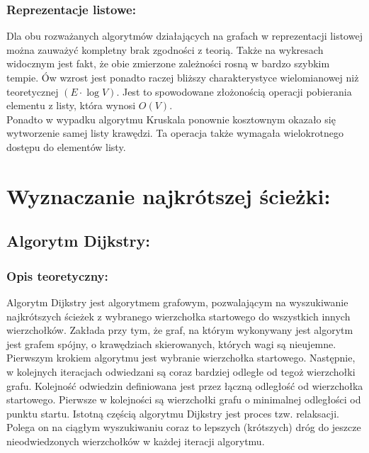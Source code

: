 \documentclass[a4paper,12pt]{article}
\begin{document}
\subsubsection{Reprezentacje listowe:}
Dla obu rozważanych algorytmów działających na grafach w reprezentacji listowej można zauważyć kompletny brak zgodności z teorią. Także na wykresach widocznym jest fakt, że obie zmierzone zależności rosną w bardzo szybkim tempie. Ów wzrost jest ponadto raczej bliższy charakterystyce wielomianowej niż teoretycznej $(E \cdot \log V)$. Jest to spowodowane złożonością operacji pobierania elementu z listy, która wynosi $O(V)$.\\

\noindent
Ponadto w wypadku algorytmu Kruskala ponownie kosztownym okazało się wytworzenie samej listy krawędzi. Ta operacja także wymagała wielokrotnego dostępu do elementów listy.

\section{Wyznaczanie najkrótszej ścieżki:}

\subsection{Algorytm Dijkstry:}

\subsubsection{Opis teoretyczny:}
Algorytm Dijkstry jest algorytmem grafowym, pozwalającym na wyszukiwanie najkrótszych ścieżek z wybranego wierzchołka startowego do wszystkich innych wierzchołków. Zakłada przy tym, że graf, na którym wykonywany jest algorytm jest grafem spójny, o krawędziach skierowanych, których wagi są nieujemne.\\

\noindent
Pierwszym krokiem algorytmu jest wybranie wierzchołka startowego. Następnie, w kolejnych iteracjach odwiedzani są coraz bardziej odległe od tegoż wierzchołki grafu. Kolejność odwiedzin definiowana jest przez łączną odległość od wierzchołka startowego. Pierwsze w kolejności są wierzchołki grafu o minimalnej odległości od punktu startu. Istotną częścią algorytmu Dijkstry jest proces tzw. relaksacji. Polega on na ciągłym wyszukiwaniu coraz to lepszych (krótszych) dróg do jeszcze nieodwiedzonych wierzchołków w każdej iteracji algorytmu.\\
\end{document}
